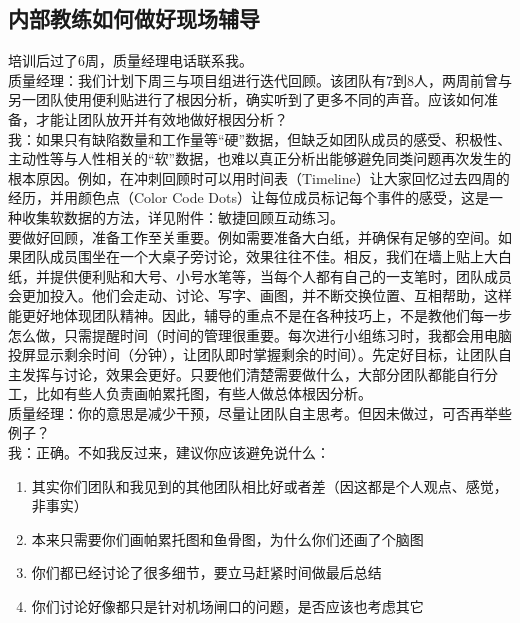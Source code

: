 \hypertarget{ux5185ux90e8ux6559ux7ec3ux5982ux4f55ux505aux597dux73b0ux573aux8f85ux5bfc}{%
\subsection{内部教练如何做好现场辅导}\label{ux5185ux90e8ux6559ux7ec3ux5982ux4f55ux505aux597dux73b0ux573aux8f85ux5bfc}}

培训后过了6周，质量经理电话联系我。\\
质量经理：我们计划下周三与项目组进行迭代回顾。该团队有7到8人，两周前曾与另一团队使用便利贴进行了根因分析，确实听到了更多不同的声音。应该如何准备，才能让团队放开并有效地做好根因分析？\\
我：如果只有缺陷数量和工作量等``硬''数据，但缺乏如团队成员的感受、积极性、主动性等与人性相关的``软''数据，也难以真正分析出能够避免同类问题再次发生的根本原因。例如，在冲刺回顾时可以用时间表（Timeline）让大家回忆过去四周的经历，并用颜色点（Color
Code
Dots）让每位成员标记每个事件的感受，这是一种收集软数据的方法，详见附件：敏捷回顾互动练习。\\
要做好回顾，准备工作至关重要。例如需要准备大白纸，并确保有足够的空间。如果团队成员围坐在一个大桌子旁讨论，效果往往不佳。相反，我们在墙上贴上大白纸，并提供便利贴和大号、小号水笔等，当每个人都有自己的一支笔时，团队成员会更加投入。他们会走动、讨论、写字、画图，并不断交换位置、互相帮助，这样能更好地体现团队精神。因此，辅导的重点不是在各种技巧上，不是教他们每一步怎么做，只需提醒时间（时间的管理很重要。每次进行小组练习时，我都会用电脑投屏显示剩余时间（分钟），让团队即时掌握剩余的时间）。先定好目标，让团队自主发挥与讨论，效果会更好。只要他们清楚需要做什么，大部分团队都能自行分工，比如有些人负责画帕累托图，有些人做总体根因分析。\\
质量经理：你的意思是减少干预，尽量让团队自主思考。但因未做过，可否再举些例子？\\
我：正确。不如我反过来，建议你应该避免说什么：

\begin{enumerate}
\tightlist
\item
  其实你们团队和我见到的其他团队相比好或者差（因这都是个人观点、感觉，非事实）
\item
  本来只需要你们画帕累托图和鱼骨图，为什么你们还画了个脑图
\item
  你们都已经讨论了很多细节，要立马赶紧时间做最后总结
\item
  你们讨论好像都只是针对机场闸口的问题，是否应该也考虑其它
\end{enumerate}

